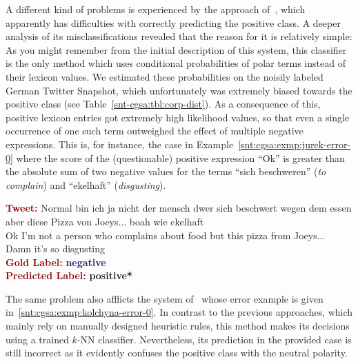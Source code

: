 A different kind of problems is experienced by the approach
of~\citet{Jurek:15}, which apparently has difficulties with correctly
predicting the positive class.  A deeper analysis of its
misclassifications revealed that the reason for it is relatively
simple: As you might remember from the initial description of this
system, this classifier is the only method which uses conditional
probabilities of polar terms instead of their lexicon values.  We
estimated these probabilities on the noisily labeled German Twitter
Snapshot, which unfortunately was extremely biased towards the
positive class (see Table~\ref{snt-cgsa:tbl:corp-dist}).  As a
consequence of this, positive lexicon entries got extremely high
likelihood values, so that even a single occurrence of one such term
outweighed the effect of multiple negative expressions.  This is, for
instance, the case in Example~\ref{snt:cgsa:exmp:jurek-error-0} where
the score of the (questionable) positive expression ``Ok'' is greater
than the absolute sum of two negative values for the terms ``sich
beschweren'' (\emph{to complain}) and ``ekelhaft''
(\emph{disgusting}).

\begin{example}\label{snt:cgsa:exmp:jurek-error-0}
  \noindent\textup{\bfseries\textcolor{darkred}{Tweet:}} {\upshape
    Normal bin ich ja nicht der mensch dwer sich beschwert wegen dem essen aber diese Pizza von Joeys... boah wie ekelhaft}\\
  \noindent Ok I'm not a person who complains about food but this pizza from Joeys... Damn it's so disgusting\\[0.65em]
  \noindent\textup{\bfseries\textcolor{darkred}{Gold Label:}}\hspace*{4.3em}\textbf{%
    \upshape\textcolor{midnightblue}{negative}}\\
 \noindent\textup{\bfseries\textcolor{darkred}{Predicted Label:}}\hspace*{2em}\textbf{%
    \upshape\textcolor{green3}{positive*}}\\
\end{example}

The same problem also afflicts the system of~\citeauthor{Kolchyna:15}
whose error example is given in~\ref{snt:cgsa:exmp:kolchyna-error-0}.
In contrast to the previous approaches, which mainly rely on manually
designed heuristic rules, this method makes its decisions using a
trained $k$-NN classifier.  Nevertheless, its prediction in the
provided case is still incorrect as it evidently confuses the positive
class with the neutral polarity.

